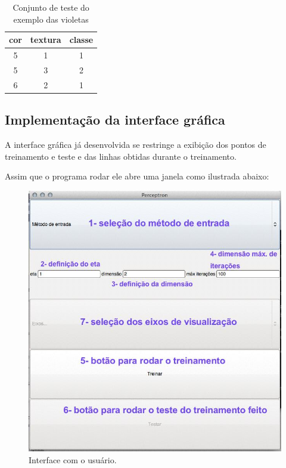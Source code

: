 \documentclass[brazil, a4paper]{article}
\begin{document}
\begin{description}
	\begin{table} [h]
			\centering
			\begin{tabular}{|c|c|c|}
			\hline
			cor & textura & classe \\ \hline
			5 & 1 & 1 \\
			5 & 3 & 2 \\
			6 & 2 & 1 \\ \hline
			\end{tabular}
			\caption{Conjunto de teste do exemplo das violetas}
		\end{table}


\subsection{Implementação da interface gráfica}

A interface gráfica já desenvolvida se restringe a exibição dos pontos de
treinamento e teste e das linhas obtidas durante o treinamento.

Assim que o programa rodar ele abre uma janela como ilustrada abaixo:

\begin{figure}[!htb]
\centering
\includegraphics[scale=0.35]{interfaceInicial.jpg}
\caption{Interface com o usuário.}
\end{figure}


\end{description}
\end{document}
